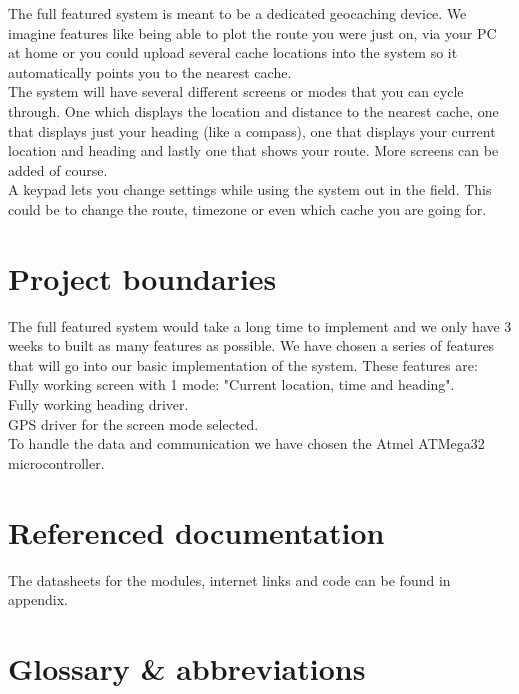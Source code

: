 The full featured system is meant to be a dedicated geocaching device. We imagine features like being able to plot the route you were just on, via your PC at home or you could upload several cache locations into the system so it automatically points you to the nearest cache.\\
The system will have several different screens or modes that you can cycle through. One which displays the location and distance to the nearest cache, one that displays just your heading (like a compass), one that displays your current location and heading and lastly one that shows your route. More screens can be added of course.\\
A keypad lets you change settings while using the system out in the field. This could be to change the route, timezone or even which cache you are going for.\\

\section{Project boundaries}
The full featured system would take a long time to implement and we only have 3 weeks to built as many features as possible. We have chosen a series of features that will go into our basic implementation of the system. These features are:
Fully working screen with 1 mode: "Current location, time and heading".\\
Fully working heading driver.\\
GPS driver for the screen mode selected. \\
To handle the data and communication we have chosen the Atmel ATMega32 microcontroller.\\

\section{Referenced documentation}
The datasheets for the modules, internet links and code can be found in appendix.

\section{Glossary \& abbreviations}







